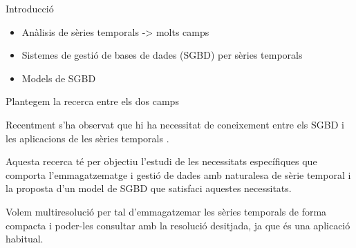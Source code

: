 \begin{frame}{Introducció}

\begin{itemize}
  \item Anàlisis de sèries temporals -> molts camps
  \item Sistemes de gestió de bases de dades (SGBD) per sèries temporals
  \item Models de SGBD
\end{itemize}

Plantegem la recerca entre els dos camps

Recentment s'ha observat que hi ha necessitat de coneixement entre els
SGBD i les aplicacions de les sèries
temporals \parencite{stonebraker09:scidb,zhang11}.

Aquesta recerca té per objectiu l’estudi de les necessitats específiques que comporta l’emmagatzematge i gestió de dades amb naturalesa de sèrie temporal i la proposta d’un model de SGBD que satisfaci aquestes necessitats.

Volem multiresolució per tal d'emmagatzemar les sèries temporals de forma compacta i poder-les consultar amb la resolució desitjada, ja que és una aplicació habitual.


\end{frame}






